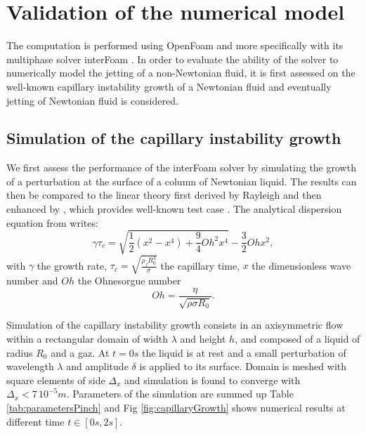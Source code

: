 \documentclass[twocolumn,10pt]{asme2ej}
\begin{document}
\section{Validation of the numerical model}
The computation is performed using OpenFoam and more specifically with its multiphase solver interFoam \cite{deshpande2012evaluating}. In order to evaluate the ability of the solver to numerically model the jetting of a non-Newtonian fluid, it is first assessed on the well-known capillary instability growth of a Newtonian fluid and eventually jetting of Newtonian fluid is considered.

\subsection{Simulation of the capillary instability growth}
We first assess the performance of the interFoam solver by simulating the growth of a perturbation at the surface of a column of Newtonian liquid. The results can then be compared to the linear theory first derived by Rayleigh \cite{rayleigh1892xvi} and then enhanced by \cite{chandrasekhar2013hydrodynamic}, which provides well-known test case \cite{delteil2011numerical,cervone2010simulation}.
The analytical dispersion equation from \cite{chandrasekhar2013hydrodynamic} writes:
\begin{equation}
    \gamma \tau_c = \sqrt{\frac{1}{2}(x^{2}-x^{4}) + \frac{9}{4}Oh^{2}x^{4}}-\frac{3}{2}Oh x^{2},
    \label{eq:growthRateAnalytical}
\end{equation}
with $\gamma$ the growth rate, $\displaystyle \tau_c = \sqrt{\frac{\rho_f R_0^3}{\sigma}}$ the capillary time, $x$ the dimensionless wave number and $Oh$ the Ohnesorgue number
\begin{equation}
    Oh=\frac{\eta}{\sqrt{\rho \sigma R_0}}.
    \label{eq:Oh2}
\end{equation} 

Simulation of the capillary instability growth consists in an axisymmetric flow within a rectangular domain of width $\lambda$ and height $h$, and composed of a liquid of radius $R_0$ and a gaz. At $t = 0s$ the liquid is at rest and a small perturbation of wavelength $\lambda$ and amplitude $\delta$ is applied to its surface. 
Domain is meshed with square elements of side $\Delta_x$ and simulation is found to converge with $\Delta_x< 7\,10^{-5}m$. Parameters of the simulation are summed up Table \ref{tab:parametersPinch} and Fig \ref{fig:capillaryGrowth} shows numerical results at different time $t \in [0s,2s]$.
\end{document}
